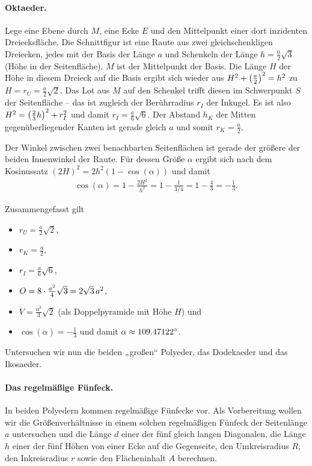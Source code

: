 \documentclass[11pt]{article}
\begin{document}
\paragraph{Oktaeder.}
Lege eine Ebene durch $M$, eine Ecke $E$ und den Mittelpunkt einer dort
inzidenten Dreiecksfläche. Die Schnittfigur ist eine Raute aus zwei
gleichschenkligen Dreiecken, jedes mit der Basis der Länge $a$ und Schenkeln
der Länge $h=\frac{a}{2}\sqrt{3}$ (Höhe in der Seitenfläche). $M$ ist der
Mittelpunkt der Basis. Die Länge $H$ der Höhe in diesem Dreieck auf die Basis
ergibt sich wieder aus $H^2+\left(\frac{a}{2}\right)^2=h^2$ zu
$H=r_U=\frac{a}{2}\sqrt{2}$. Das Lot aus $M$ auf den Schenkel trifft diesen im
Schwerpunkt $S$ der Seitenfläche -- das ist zugleich der Berührradius $r_I$
der Inkugel. Es ist also $H^2=\left(\frac23 h\right)^2+r_I^2$ und damit
$r_I=\frac{a}{6}\sqrt{6}$.  Der Abstand $h_K$ der Mitten gegenüberliegender
Kanten ist gerade gleich $a$ und somit $r_K=\frac{a}{2}$.

Der Winkel zwischen zwei benachbarten Seitenflächen ist gerade der größere der
beiden Innenwinkel der Raute.  Für dessen Größe $\alpha$ ergibt sich nach dem
Kosinussatz $(2H)^2=2h^2(1-\cos(\alpha))$ und damit
\begin{gather*}
  \cos(\alpha)=1-\frac{2H^2}{h^2}=1-\frac{1}{3/4}=1-\frac43=-\frac13.
\end{gather*}
\newpage

Zusammengefasst gilt
\begin{itemize}
\item $r_U=\frac{a}{2}\sqrt{2}$, 
\item $r_K=\frac{a}{2}$,
\item $r_I=\frac{a}{6}\sqrt{6}$,
\item $O=8\cdot\frac{a^2}{4}\sqrt{3}=2\sqrt{3}\,a^2$,
\item $V=\frac{a^3}{3}\sqrt{2}$ (als Doppelpyramide mit Höhe $H$) und
\item $\cos(\alpha)=-\frac13$ und damit $\alpha\approx 109.47122^{\circ}$.
\end{itemize}

Untersuchen wir nun die beiden „großen“ Polyeder, das Dodekaeder und das
Ikosaeder. 

\paragraph{Das regelmäßige Fünfeck.}
In beiden Polyedern kommen regelmäßige Fünfecke vor. Als Vorbereitung wollen
wir die Größenverhältnisse in einem solchen regelmäßigen Fünfeck der
Seitenlänge $a$ untersuchen und die Länge $d$ einer der fünf gleich langen
Diagonalen, die Länge $h$ einer der fünf Höhen von einer Ecke auf die
Gegenseite, den Umkreisradius $R$, den Inkreisradius $r$ sowie den
Flächeninhalt $A$ berechnen.
\end{document}
